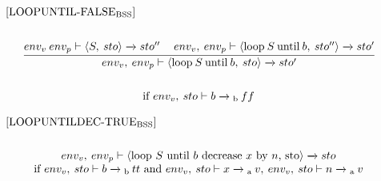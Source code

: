 \begin{equation}
\begin{split}
\begin{minipage}{\linewidth}
$[\text{LOOPUNTIL-FALSE}_\text{BSS}]$
\end{minipage}
\\\\
\begin{minipage}{\linewidth}
\centering
$\cfrac{env_v \: env_p \vdash \langle S, \: sto \rangle \xrightarrow{} sto'' \quad\: env_v, \: env_p \vdash \langle \text{loop} \: S \: \text{until} \: b, \: sto'' \rangle \xrightarrow{} sto'}{env_v, \: env_p \vdash \langle \text{loop} \: S \: \text{until} \: b, \: sto \rangle \xrightarrow{} sto'}$ 
\end{minipage}
\\\\
\begin{minipage}{\linewidth}
\centering
if $env_v, \: sto \vdash b \xrightarrow{}\textsubscript{b} \: ff$
\end{minipage}
\end{split}
\end{equation}

\begin{equation}
\begin{split}
\begin{minipage}{\linewidth}
$[\text{LOOPUNTILDEC-TRUE}_\text{BSS}]$
\end{minipage}
\\\\
\begin{minipage}{\linewidth}
\centering
$env_v, \: env_p \vdash \langle $loop $S$ until $b$ decrease $x$ by $n$, sto$\rangle \xrightarrow{} sto$ \\
if $env_v, \: sto \vdash b \xrightarrow{}\textsubscript{b} \: tt$ and $env_v, \: sto \vdash x \xrightarrow{}\textsubscript{a} \: v, \: env_v, \: sto \vdash n \xrightarrow{}\textsubscript{a} \: v$ 
\end{minipage}
\end{split}
\end{equation}

